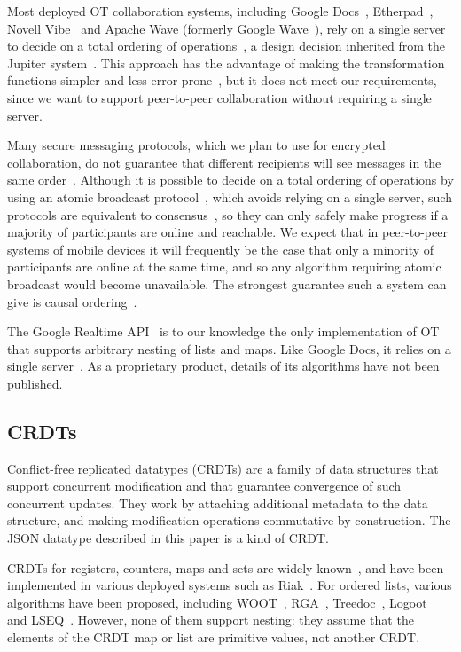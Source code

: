 \documentclass[10pt,journal,compsoc]{IEEEtran}
\begin{document}
Most deployed OT collaboration systems, including Google Docs~\cite{DayRichter:2010tt}, Etherpad~\cite{Etherpad:2011um}, Novell Vibe~\cite{Spiewak:2010vw} and Apache Wave (formerly Google Wave~\cite{Wang:2015vo}), rely on a single server to decide on a total ordering of operations~\cite{Lemonik:2016wh}, a design decision inherited from the Jupiter system~\cite{Nichols:1995fd}. This approach has the advantage of making the transformation functions simpler and less error-prone~\cite{Imine:2003ks}, but it does not meet our requirements, since we want to support peer-to-peer collaboration without requiring a single server.

Many secure messaging protocols, which we plan to use for encrypted collaboration, do not guarantee that different recipients will see messages in the same order~\cite{Unger:2015kg}. Although it is possible to decide on a total ordering of operations by using an atomic broadcast protocol~\cite{Defago:2004ji}, which avoids relying on a single server, such protocols are equivalent to consensus~\cite{Chandra:1996cp}, so they can only safely make progress if a majority of participants are online and reachable. We expect that in peer-to-peer systems of mobile devices it will frequently be the case that only a minority of participants are online at the same time, and so any algorithm requiring atomic broadcast would become unavailable. The strongest guarantee such a system can give is causal ordering~\cite{Attiya:2015dm}.

The Google Realtime API~\cite{Google:2015vk} is to our knowledge the only implementation of OT that supports arbitrary nesting of lists and maps. Like Google Docs, it relies on a single server~\cite{Lemonik:2016wh}. As a proprietary product, details of its algorithms have not been published.

\subsection{CRDTs}\label{sec:related-crdts}

Conflict-free replicated datatypes (CRDTs) are a family of data structures that support concurrent modification and that guarantee convergence of such concurrent updates. They work by attaching additional metadata to the data structure, and making modification operations commutative by construction. The JSON datatype described in this paper is a kind of CRDT.

CRDTs for registers, counters, maps and sets are widely known~\cite{Shapiro:2011un,Shapiro:2011wy}, and have been implemented in various deployed systems such as Riak~\cite{Brown:2014hs,Brown:2013wy}. For ordered lists, various algorithms have been proposed, including WOOT~\cite{Oster:2006wj}, RGA~\cite{Roh:2011dw}, Treedoc~\cite{Preguica:2009fz}, Logoot~\cite{Weiss:2010hx} and LSEQ~\cite{Nedelec:2013ky}. However, none of them support nesting: they assume that the elements of the CRDT map or list are primitive values, not another CRDT.
\end{document}
